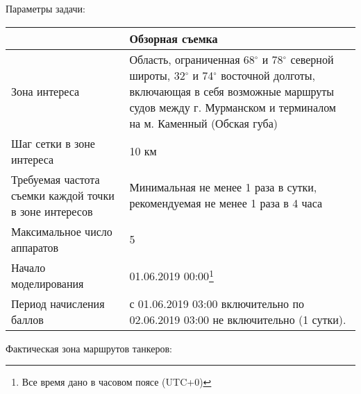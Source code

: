Параметры задачи:

\begin{table}[H]
    \center
    \begin{tabular}{|p{5cm}|p{10cm}|}
        \hline
        &Обзорная съемка \\
        \hline
        Зона интереса & Область, ограниченная 68$^\circ$ и 78$^\circ$ северной широты, 32$^\circ$ и 74$^\circ$  восточной долготы, включающая в себя возможные маршруты судов между г. Мурманском и терминалом на м. Каменный (Обская губа) \\
        \hline
        Шаг сетки в зоне интереса & 10 км \\
        \hline
        Требуемая частота съемки каждой точки в зоне интересов & Минимальная не менее 1 раза в сутки, рекомендуемая не менее 1 раза в 4 часа \\
        \hline
        Максимальное число аппаратов & 5 \\
        \hline
        Начало моделирования & 01.06.2019 00:00\footnote{Все время дано в часовом поясе (UTC+0)}     \\
        \hline
        Период начисления баллов & с 01.06.2019 03:00 включительно по 02.06.2019 03:00 не включительно (1 сутки). \\
        \hline
    \end{tabular}
\end{table}

Фактическая зона маршрутов танкеров:


\markSection

